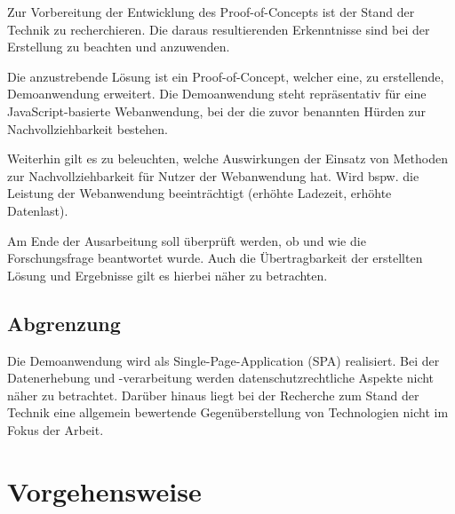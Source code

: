
Zur Vorbereitung der Entwicklung des Proof-of-Concepts ist der Stand der Technik zu recherchieren. Die daraus resultierenden Erkenntnisse sind bei der Erstellung zu beachten und anzuwenden.

Die anzustrebende Lösung ist ein Proof-of-Concept, welcher eine, zu erstellende, Demoanwendung erweitert. Die Demoanwendung steht repräsentativ für eine JavaScript-basierte Webanwendung, bei der die zuvor benannten Hürden zur Nachvollziehbarkeit bestehen.

Weiterhin gilt es zu beleuchten, welche Auswirkungen der Einsatz von Methoden zur Nachvollziehbarkeit für Nutzer der Webanwendung hat. Wird bspw. die Leistung der Webanwendung beeinträchtigt (erhöhte Ladezeit, erhöhte Datenlast).

Am Ende der Ausarbeitung soll überprüft werden, ob und wie die Forschungsfrage beantwortet wurde. Auch die Übertragbarkeit der erstellten Lösung und Ergebnisse gilt es hierbei näher zu betrachten.

\subsection{Abgrenzung}


Die Demoanwendung wird als Single-Page-Application (SPA) \cite{SinglePageApplication} realisiert. Bei der Datenerhebung und -verarbeitung werden datenschutzrechtliche Aspekte nicht näher zu betrachtet. Darüber hinaus liegt bei der Recherche zum Stand der Technik eine allgemein bewertende Gegenüberstellung von Technologien nicht im Fokus der Arbeit.

\pagebreak

\section{Vorgehensweise}

